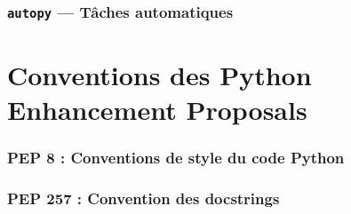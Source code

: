 \documentclass[a4paper, 10pt]{article}
\begin{document}
\section{\texttt{autopy} --- Tâches automatiques}

\part{Conventions des Python Enhancement Proposals}
\section{PEP 8 : Conventions de style du code Python}
\section{PEP 257 : Convention des docstrings}


\printindex
\end{document}
